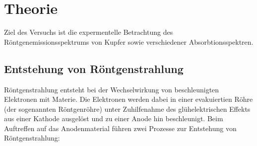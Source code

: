 \maketitle
\setcounter{page}{1}
\tableofcontents
\newpage
{}
\section{Theorie}
Ziel des Versuchs ist die expermentelle Betrachtung des Röntgenemissionsspektrums
von Kupfer sowie verschiedener Absorbtionsspektren.
\subsection{Entstehung von Röntgenstrahlung}
Röntgenstrahlung entsteht bei der Wechselwirkung von beschleunigten Elektronen
mit Materie. Die Elektronen werden dabei in einer evakuiertien Röhre (der sogenannten
Röntgenröhre) unter Zuhilfenahme des glühelektrischen Effekts aus einer Kathode ausgelöst
und zu einer Anode hin beschleunigt. Beim Auftreffen auf das Anodenmaterial führen
zwei Prozesse zur Entstehung von Röntgenstrahlung:
